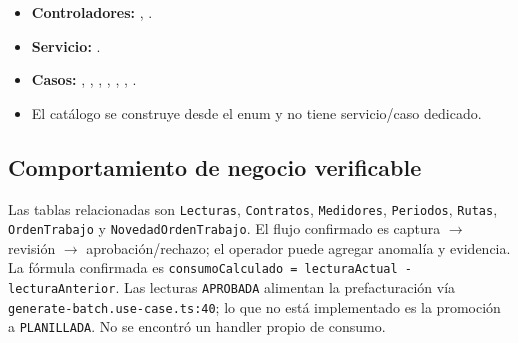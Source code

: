 \begin{itemize}
\item \textbf{Controladores:} \texttt{}, \texttt{}.
\item \textbf{Servicio:} \texttt{}.
\item \textbf{Casos:} \texttt{}, \texttt{}, \texttt{}, \texttt{}, \texttt{}, \texttt{}, \texttt{}.
\item El catálogo \texttt{} se construye desde el enum y no tiene servicio/caso dedicado.
\end{itemize}

\subsection{Comportamiento de negocio verificable}
Las tablas relacionadas son \texttt{Lecturas}, \texttt{Contratos}, \texttt{Medidores}, \texttt{Periodos}, \texttt{Rutas}, \texttt{OrdenTrabajo} y \texttt{NovedadOrdenTrabajo}. El flujo confirmado es captura $\rightarrow$ revisión $\rightarrow$ aprobación/rechazo; el operador puede agregar anomalía y evidencia. La fórmula confirmada es \texttt{consumoCalculado = lecturaActual - lecturaAnterior}. Las lecturas \texttt{APROBADA} alimentan la prefacturación vía \texttt{generate-batch.use-case.ts:40}; lo que no está implementado es la promoción a \texttt{PLANILLADA}. No se encontró un handler propio de consumo.


